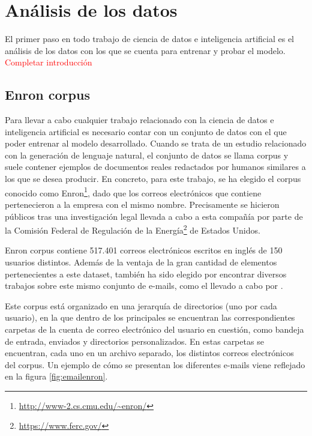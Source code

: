 \section{Análisis de los datos}
El primer paso en todo trabajo de ciencia de datos e inteligencia artificial es el análisis de los datos con los que se cuenta para entrenar y probar el modelo. \textcolor{red}{Completar introducción}

\subsection{Enron corpus}\label{ss:enron}
Para llevar a cabo cualquier trabajo relacionado con la ciencia de datos e inteligencia artificial es necesario contar con un conjunto de datos con el que poder entrenar al modelo desarrollado. Cuando se trata de un estudio relacionado con la generación de lenguaje natural, el conjunto de datos se llama corpus y suele contener ejemplos de documentos reales redactados por humanos similares a los que se desea producir. En concreto, para este trabajo, se ha elegido el corpus conocido como Enron\footnote{\url{http://www-2.cs.cmu.edu/~enron/}}, dado que los correos electrónicos que contiene pertenecieron a la empresa con el mismo nombre. Precisamente se hicieron públicos tras una investigación legal llevada a cabo a esta compañía por parte de la Comisión Federal de Regulación de la Energía\footnote{\url{https://www.ferc.gov/}} de Estados Unidos.

Enron corpus contiene 517.401 correos electrónicos escritos en inglés de 150 usuarios distintos. Además de la ventaja de la gran cantidad de elementos pertenecientes a este dataset, también ha sido elegido por encontrar diversos trabajos sobre este mismo conjunto de e-mails, como el llevado a cabo por \cite{klimt2004introducing}.

Este corpus está organizado en una jerarquía de directorios (uno por cada usuario), en la que dentro de los principales se encuentran las correspondientes carpetas de la cuenta de correo electrónico del usuario en cuestión, como bandeja de entrada, enviados y directorios personalizados. En estas carpetas se encuentran, cada uno en un archivo separado, los distintos correos electrónicos del corpus. Un ejemplo de cómo se presentan los diferentes e-mails viene reflejado en la figura \ref{fig:emailenron}.

